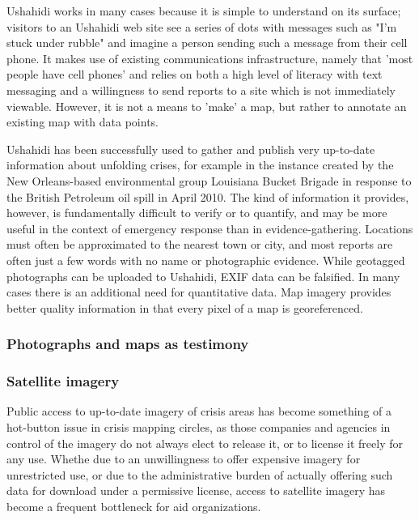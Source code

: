 \documentclass[11pt]{report}
\begin{document}

Ushahidi works in many cases because it is simple to understand on its surface; visitors to an Ushahidi web site see a series of dots with messages such as "I'm stuck under rubble" and imagine a person sending such a message from their cell phone. It makes use of existing communications infrastructure, namely that 'most people have cell phones' and relies on both a high level of literacy with text messaging and a willingness to send reports to a site which is not immediately viewable. However, it is not a means to 'make' a map, but rather to annotate an existing map with data points.

Ushahidi has been successfully used to gather and publish very up-to-date information about unfolding crises, for example in the instance created by the New Orleans-based environmental group Louisiana Bucket Brigade in response to the British Petroleum oil spill in April 2010. The kind of information it provides, however, is fundamentally difficult to verify or to quantify, and may be more useful in the context of emergency response than in evidence-gathering. Locations must often be approximated to the nearest town or city, and most reports are often just a few words with no name or photographic evidence. While geotagged photographs can be uploaded to Ushahidi, EXIF data can be falsified. In many cases there is an additional need for quantitative data. Map imagery provides better quality information in that every pixel of a map is georeferenced.  

\subsubsection{Photographs and maps as testimony}



\subsubsection{Satellite imagery}

Public access to up-to-date imagery of crisis areas has become something of a hot-button issue in crisis mapping circles, as those companies and agencies in control of the imagery do not always elect to release it, or to license it freely for any use. Whethe due to an unwillingness to offer expensive imagery for unrestricted use, or due to the administrative burden of actually offering such data for download under a permissive license, access to satellite imagery has become a frequent bottleneck for aid organizations. 
\end{document}
